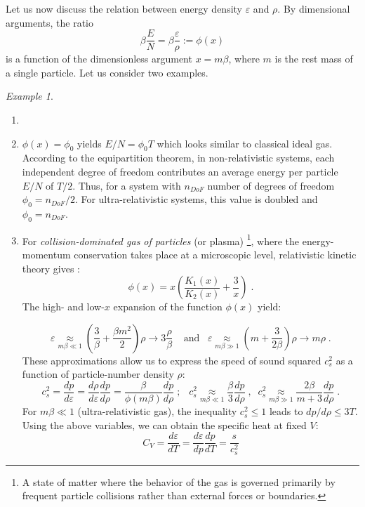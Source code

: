 \documentclass[a4paper,12pt]{amsart}
\theoremstyle{definition}
\theoremstyle{remark}
\newtheorem{Example}{Example}[section]
\begin{document}
Let us now discuss the relation between energy density $\varepsilon$ and $\rho$. By dimensional arguments, the ratio 
\begin{equation}\label{phix}
 \beta\frac{E}{N}=\beta\frac{\varepsilon}{\rho}:=\phi(x) 
\end{equation}
is a function of the dimensionless argument $x=m\beta$, where $m$ is the rest mass of a single particle.  
Let us consider two examples. 
\begin{Example}\label{phi_ex}
 \begin{enumerate}[label=(\roman*), leftmargin=*]
 \item[]
 \item $\phi(x)=\phi_0$ yields  $E/N= \phi_0 T$ which looks similar to classical ideal gas. According to the equipartition theorem\cite{Lanlif}, in non-relativistic systems, each independent degree of freedom contributes an average energy per particle $E/N$ of $T/2$. Thus, for a system with $n_{DoF}$ number of degrees of freedom $\phi_0=n_{DoF}/2$. For ultra-relativistic systems, this value is doubled and $\phi_0=n_{DoF}$.
 
 \item For {\it collision-dominated gas of particles} (or plasma)
 \footnote{A state of matter where the behavior of the gas is governed primarily by frequent particle collisions rather than external forces or boundaries.}, where the energy-momentum conservation takes place at a microscopic level, relativistic kinetic theory gives \cite{Csernai, DeGroot}:  
\begin{equation} \label{eq: collgas}
    \phi(x) =x\left(\frac{K_1 (x)}{K_2(x)} + \frac{3}{x} \right)  \;.
\end{equation}
The high- and low-$x$ expansion of the function $\phi(x)$ yield:

\begin{equation} \label {eq: collgas1}
\varepsilon   \underset{m\beta \ll 1}{\approx}  \left(\frac{3}{\beta }+\frac{\beta  m^2}{2}\right)\rho \rightarrow 3\frac{\rho}{\beta}\;\;\;\; \text{and} \;\;\; 
\varepsilon   \underset{m\beta \gg 1}{\approx} \left(m+\frac{3}{2 \beta}\right)\rho 
\rightarrow m \rho\;.
\end{equation}
These approximations allow us to express the speed of sound squared $c_s^2$ as a function of particle-number density $\rho$:
\begin{equation}\label{c_s}
c_s^2=\frac{dp}{d\varepsilon}=\frac{d\rho}{d\varepsilon} \frac{dp}{d\rho}=\frac{\beta}{\phi(m\beta)}\frac{dp}{d\rho}\;;\;\;\:
c_s^2\underset{m\beta \ll 1}{\approx}\frac{\beta}{3}\frac{dp}{d\rho}\;,\;\; c_s^2 \underset{m\beta \gg 1}{\approx}\frac{2\beta}{m+3}\frac{dp}{d\rho} \;.
\end{equation}
For $m\beta\ll1$ (ultra-relativistic gas), the inequality $c^2_s\leq 1$ leads to $dp/d\rho\leq 3T$.
Using the above variables, we can obtain the specific heat at fixed $V$:
\[
C_V=\frac{d\varepsilon}{dT}=\frac{d \varepsilon}{dp} \frac{dp}{dT} =\frac{s}{c^2_s}
\]
\end{enumerate}
\end{Example}
\end{document}
